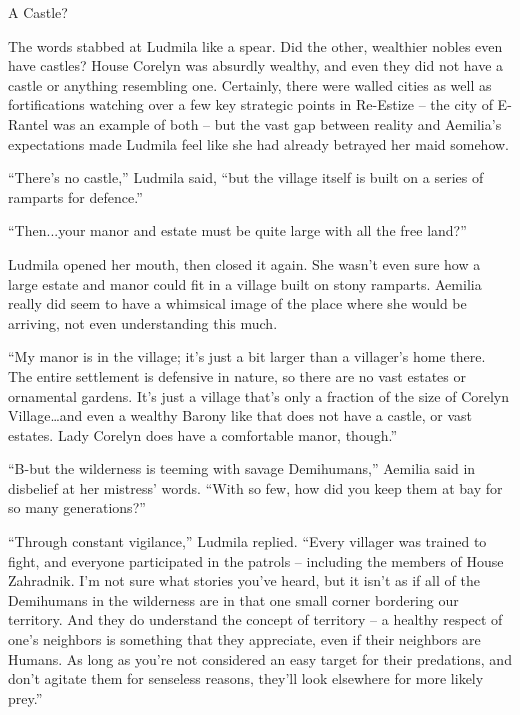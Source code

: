  

A Castle?

 

The words stabbed at Ludmila like a spear. Did the other, wealthier nobles even have castles? House Corelyn was absurdly wealthy, and even they did not have a castle or anything resembling one. Certainly, there were walled cities as well as fortifications watching over a few key strategic points in Re-Estize – the city of E-Rantel was an example of both – but the vast gap between reality and Aemilia’s expectations made Ludmila feel like she had already betrayed her maid somehow.

 

“There’s no castle,” Ludmila said, “but the village itself is built on a series of ramparts for defence.”

 

“Then...your manor and estate must be quite large with all the free land?”

 

Ludmila opened her mouth, then closed it again. She wasn’t even sure how a large estate and manor could fit in a village built on stony ramparts. Aemilia really did seem to have a whimsical image of the place where she would be arriving, not even understanding this much.

 

“My manor is in the village; it’s just a bit larger than a villager’s home there. The entire settlement is defensive in nature, so there are no vast estates or ornamental gardens. It’s just a village that’s only a fraction of the size of Corelyn Village…and even a wealthy Barony like that does not have a castle, or vast estates. Lady Corelyn does have a comfortable manor, though.”

 

“B-but the wilderness is teeming with savage Demihumans,” Aemilia said in disbelief at her mistress’ words. “With so few, how did you keep them at bay for so many generations?”

 

“Through constant vigilance,” Ludmila replied. “Every villager was trained to fight, and everyone participated in the patrols – including the members of House Zahradnik. I’m not sure what stories you’ve heard, but it isn’t as if all of the Demihumans in the wilderness are in that one small corner bordering our territory. And they do understand the concept of territory – a healthy respect of one’s neighbors is something that they appreciate, even if their neighbors are Humans. As long as you’re not considered an easy target for their predations, and don’t agitate them for senseless reasons, they’ll look elsewhere for more likely prey.”

